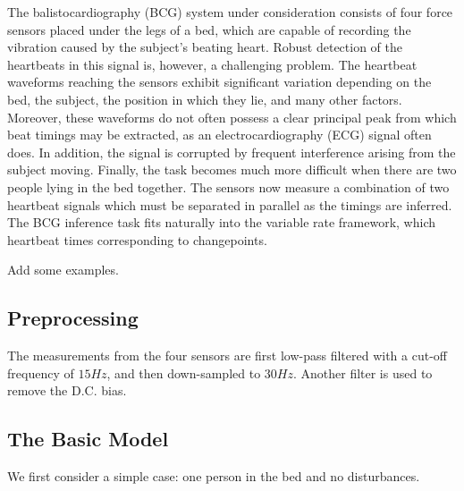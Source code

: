 \documentclass{article}
\begin{document}
The balistocardiography (BCG) system under consideration consists of four force sensors placed under the legs of a bed, which are capable of recording the vibration caused by the subject's beating heart. Robust detection of the heartbeats in this signal is, however, a challenging problem. The heartbeat waveforms reaching the sensors exhibit significant variation depending on the bed, the subject, the position in which they lie, and many other factors. Moreover, these waveforms do not often possess a clear principal peak from which beat timings may be extracted, as an electrocardiography (ECG) signal often does. In addition, the signal is corrupted by frequent interference arising from the subject moving. Finally, the task becomes much more difficult when there are two people lying in the bed together. The sensors now measure a combination of two heartbeat signals which must be separated in parallel as the timings are inferred. The BCG inference task fits naturally into the variable rate framework, which heartbeat times corresponding to changepoints.

{\meta Add some examples.}



\subsection{Preprocessing}

The measurements from the four sensors are first low-pass filtered with a cut-off frequency of $15Hz$, and then down-sampled to $30Hz$. Another filter is used to remove the D.C. bias.



\subsection{The Basic Model}

We first consider a simple case: one person in the bed and no disturbances.
\end{document}
